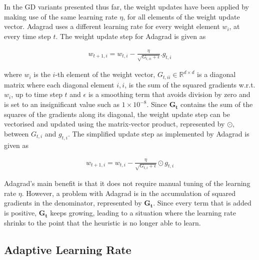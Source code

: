 In the \acs{GD} variants presented thus far, the weight updates have been applied by making use of the same learning rate $\eta$, for all elements of the weight update vector. \Acs{Adagrad} uses a different learning rate for every weight element $w_{i}$, at every time step $t$. The weight update step for \acs{Adagrad} is given as

\begin{equation}
	\label{eq:heuristics:gd:adagrad_part_1}
	\begin{split}
		w_{t+1,i} = w_{t,i} - \frac{\eta}{\sqrt{G_{t,ii} + \epsilon}}.g_{t,i}
	\end{split}
\end{equation}

where $w_{i}$ is the $i$-th element of the weight vector, $G_{t,ii} \in \mathbb{R}^{d \times d}$ is a diagonal matrix where each diagonal element $i,i$, is the sum of the squared gradients w.r.t. $w_{i}$, up to time step $t$ and $\epsilon$ is a smoothing term that avoids division by zero and is set to an insignificant value such as $1 \times 10^{-8}$. Since $\boldsymbol{G_{t}}$ contains the sum of the squares of the gradients along its diagonal, the weight update step can be vectorised and updated using the matrix-vector product, represented by $\odot$, between $G_{t,i}$ and $g_{t,i}$. The simplified update step as implemented by \acs{Adagrad} is given as

\begin{equation}
	\label{eq:heuristics:gd:adagrad_part_2}
	\begin{split}
		w_{t+1,i} = w_{t,i} - \frac{\eta}{\sqrt{G_{t,i} + \epsilon}} \odot g_{t,i}
	\end{split}
\end{equation}

\Ac{Adagrad}'s main benefit is that it does not require manual tuning of the learning rate $\eta$. However, a problem with \acs{Adagrad} is in the accumulation of squared gradients in the denominator, represented by $\boldsymbol{G_{t}}$. Since every term that is added is positive, $\boldsymbol{G_{t}}$ keeps growing, leading to a situation where the learning rate shrinks to the point that the heuristic is no longer able to learn.

\subsection{Adaptive Learning Rate}\label{sec:heuristics:adadelta}

